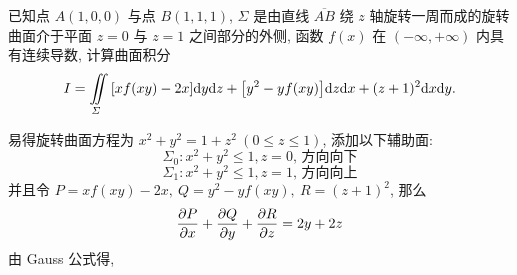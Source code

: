 \begin{example}
    已知点 $A(1,0,0)$ 与点 $B(1,1,1)$, $\varSigma$ 是由直线 $\overline{AB} $ 绕 $z$ 轴旋转一周而成的旋转曲面介于平面 $z=0$ 与 $z=1$ 之间部分的外侧,
    函数 $f(x)$ 在 $(-\infty,+\infty)$ 内具有连续导数, 计算曲面积分 $$I=\iint\limits_\varSigma\qty[xf(xy)-2x]\dd y\dd z+\qty[y^2-yf(xy)]\dd z\dd x+(z+1)^2\dd x\dd y.$$
\end{example}
\begin{solution}
    易得旋转曲面方程为 $x^2+y^2=1+z^2~ (0\leqslant z\leqslant 1)$, 添加以下辅助面:
    $$\varSigma_0:x^2+y^2\leqslant 1,z=0\text{, 方向向下}$$
    $$\varSigma_1:x^2+y^2\leqslant 1,z=1\text{, 方向向上}$$
    并且令 $P=xf(xy)-2x,~Q=y^2-yf(xy),~R=(z+1)^2$, 那么
    $$\pdv{P}{x}+\pdv{Q}{y}+\pdv{R}{z}=2y+2z$$
    由 Gauss 公式得,
\end{solution}


